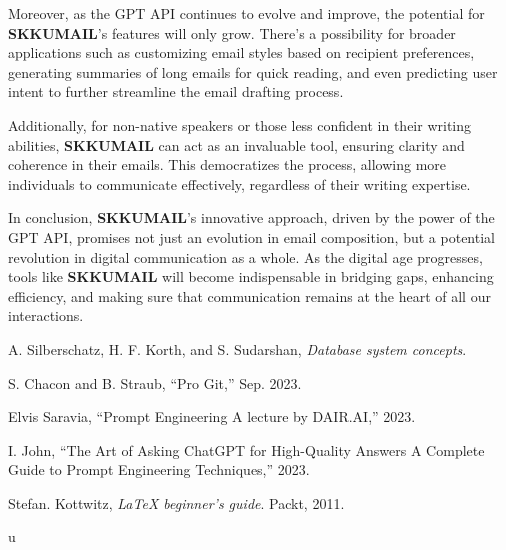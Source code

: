 Moreover, as the GPT API continues to evolve and improve, the potential for \textbf{SKKUMAIL}'s features will only grow. There's a possibility for broader applications such as customizing email styles based on recipient preferences, generating summaries of long emails for quick reading, and even predicting user intent to further streamline the email drafting process.

Additionally, for non-native speakers or those less confident in their writing abilities, \textbf{SKKUMAIL} can act as an invaluable tool, ensuring clarity and coherence in their emails. This democratizes the process, allowing more individuals to communicate effectively, regardless of their writing expertise.

In conclusion, \textbf{SKKUMAIL}'s innovative approach, driven by the power of the GPT API, promises not just an evolution in email composition, but a potential revolution in digital communication as a whole. As the digital age progresses, tools like \textbf{SKKUMAIL} will become indispensable in bridging gaps, enhancing efficiency, and making sure that communication remains at the heart of all our interactions.


\begin{thebibliography}{99}
		
	A. Silberschatz, H. F. Korth, and S. Sudarshan, 
	\textit{Database system concepts}.
		
	S. Chacon and B. Straub, 
	``Pro Git,'' 
	Sep. 2023.
		
	Elvis Saravia, 
	``Prompt Engineering A lecture by DAIR.AI,'' 
	2023.
		
	I. John, 
	``The Art of Asking ChatGPT for High-Quality Answers A Complete Guide to Prompt Engineering Techniques,'' 
	2023.
		
	Stefan. Kottwitz, 
	\textit{LaTeX beginner’s guide}. 
	Packt, 2011.
		
\end{thebibliography}

u
